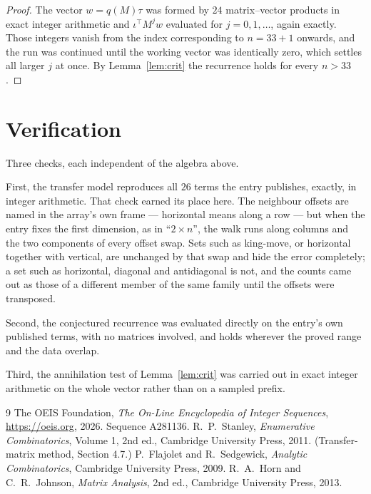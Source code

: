 \documentclass[11pt,a4paper]{article}
\theoremstyle{plain}
\theoremstyle{definition}
\begin{document}
\begin{proof}
The vector $w=q(M)\tau$ was formed by $24$ matrix--vector products in exact integer
arithmetic and $\iota^{\!\top}M^{j}w$ evaluated for $j=0,1,\dots$, again exactly. Those
integers vanish from the index corresponding to $n=33+1$ onwards, and the run was
continued until the working vector was identically zero, which settles all larger $j$ at once.
By Lemma~\ref{lem:crit} the recurrence holds for every $n>33$.
\end{proof}

\section{Verification}

Three checks, each independent of the algebra above.

First, the transfer model reproduces all $26$ terms the entry publishes, exactly, in
integer arithmetic. That check earned its place here. The neighbour offsets are named in the
array's own frame --- horizontal means along a row --- but when the entry fixes the first
dimension, as in ``$2\times n$'', the walk runs along columns and the two components of every
offset swap. Sets such as king-move, or horizontal together with vertical, are unchanged by
that swap and hide the error completely; a set such as horizontal, diagonal and antidiagonal
is not, and the counts came out as those of a different member of the same family until the
offsets were transposed.

Second, the conjectured recurrence was evaluated directly on the entry's own published terms,
with no matrices involved, and holds wherever the proved range and the data overlap.

Third, the annihilation test of Lemma~\ref{lem:crit} was carried out in exact integer
arithmetic on the whole vector rather than on a sampled prefix.

\begin{thebibliography}{9}
 The OEIS Foundation, \emph{The On-Line Encyclopedia of Integer
Sequences}, \url{https://oeis.org}, 2026. Sequence A281136.
 R.~P.~Stanley, \emph{Enumerative Combinatorics}, Volume 1, 2nd ed.,
Cambridge University Press, 2011. (Transfer-matrix method, Section 4.7.)
 P.~Flajolet and R.~Sedgewick, \emph{Analytic Combinatorics}, Cambridge
University Press, 2009.
 R.~A.~Horn and C.~R.~Johnson, \emph{Matrix Analysis}, 2nd ed., Cambridge
University Press, 2013.
\end{thebibliography}
\end{document}
